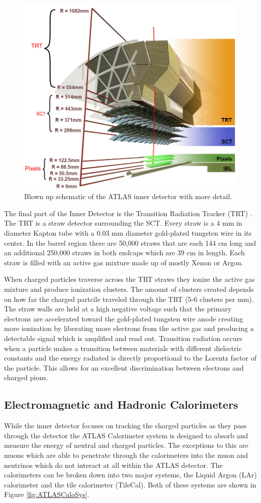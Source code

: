 \begin{figure}[ht!]
	\centering
	\includegraphics[width=0.5\columnwidth]{../ThesisImages/LHCImages/ATLASInnerStructure.png}
	\caption[Blown up schematic of the ATLAS inner detector with more detail.]{Blown up schematic of the ATLAS inner detector with more detail\cite{Potamianos:2016ptf}.
	}
	\label{fig:ATLASInnerDet}
\end{figure}

The final part of the Inner Detector is the Transition Radiation Tracker (TRT) \cite{Mindur:2017nqn}.  The TRT is a straw detector surrounding the SCT.  Every straw is a 4 mm in diameter Kapton tube with a 0.03 mm diameter gold-plated tungsten wire in its center.  In the barrel region there are 50,000 straws that are each 144 cm long and an additional 250,000 straws in both endcaps which are 39 cm in length.  Each straw is filled with an active gas mixture made up of mostly Xenon or Argon. 

When charged particles traverse across the TRT straws they ionize the active gas mixture and produce ionization clusters.  The amount of clusters created depends on how far the charged partcile traveled through the TRT (5-6 clusters per mm).  The straw walls are held at a high negative voltage such that the primary electrons are accelerated toward the gold-plated tungsten wire anode creating more ionization by liberating more electrons from the active gas and producing a detectable signal which is amplified and read out.  Transition radiation occurs when a particle makes a transition between materials with different dielectric constants and the energy radiated is directly proportional to the Lorentz factor of the particle.  This allows for an excellent discrimination between electrons and charged pions.



\subsection{Electromagnetic and Hadronic Calorimeters}
\label{sec:EMHCal}
While the inner detector focuses on tracking the charged particles as they pass through the detector the ATLAS Calorimeter system is designed to absorb and measure the energy of neutral and charged particles.  The exceptions to this are muons which are able to penetrate through the calorimeters into the muon and neutrinos which do not interact at all within the ATLAS detector.  The calorimeters can be broken down into two major systems, the Liquid Argon (LAr) calorimeter\cite{CERN-LHCC-96-041} and the tile calorimeter (TileCal)\cite{CERN-LHCC-96-042}.  Both of these systems are shown in Figure \ref{fig:ATLASCaloSys}.

